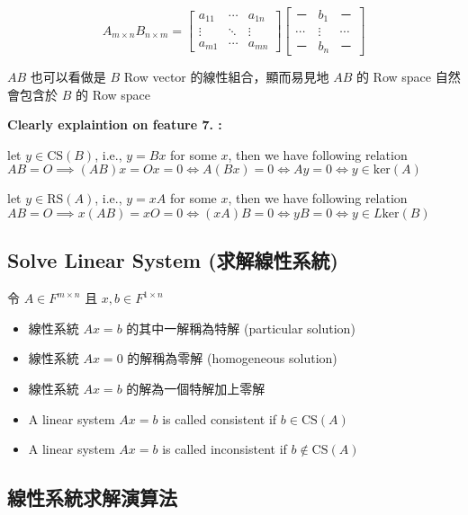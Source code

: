 \documentclass[
]{book}
\providecommand{\tightlist}{%
  \setlength{\itemsep}{0pt}\setlength{\parskip}{0pt}}
\begin{document}
\[
A_{m\times n}B_{n \times m} = \begin{bmatrix}
 a_{11} & \cdots & a_{1n}\\
 \vdots & \ddots & \vdots\\
 a_{m1} & \cdots & a_{mn}
\end{bmatrix}\begin{bmatrix}
 － & b_1 & －\\
 \cdots & \vdots & \cdots\\
 － & b_n &－
\end{bmatrix}
\]

\(AB\) 也可以看做是 \(B\) Row vector 的線性組合，顯而易見地 \(AB\) 的 Row space 自然會包含於 \(B\) 的 Row space

\textbf{Clearly explaintion on feature 7. :}

let \(y \in \mbox{CS}(B)\), i.e., \(y = Bx\) for some \(x\), then we have following relation \(AB = O \implies (AB)x = Ox = 0 \iff A(Bx) = 0 \iff Ay = 0 \iff y \in \mbox{ker}(A)\)

let \(y \in \mbox{RS}(A)\), i.e., \(y = xA\) for some \(x\), then we have following relation \(AB = O \implies x(AB) = xO = 0 \iff (xA)B = 0 \iff yB = 0 \iff y \in L\mbox{ker}(B)\)

\hypertarget{solve-linear-system-ux6c42ux89e3ux7ddaux6027ux7cfbux7d71}{%
\subsection{Solve Linear System (求解線性系統)}\label{solve-linear-system-ux6c42ux89e3ux7ddaux6027ux7cfbux7d71}}

令 \(A \in F^{m \times n}\) 且 \(x, b \in F^{1 \times n}\)

\begin{itemize}
\tightlist
\item
  線性系統 \(Ax = b\) 的其中一解稱為特解 (particular solution)
\item
  線性系統 \(Ax = 0\) 的解稱為零解 (homogeneous solution)
\item
  線性系統 \(Ax = b\) 的解為一個特解加上零解
\item
  A linear system \(Ax = b\) is called consistent if \(b \in \mbox{CS}(A)\)
\item
  A linear system \(Ax = b\) is called inconsistent if \(b \notin \mbox{CS}(A)\)
\end{itemize}

\hypertarget{ux7ddaux6027ux7cfbux7d71ux6c42ux89e3ux6f14ux7b97ux6cd5}{%
\subsection{線性系統求解演算法}\label{ux7ddaux6027ux7cfbux7d71ux6c42ux89e3ux6f14ux7b97ux6cd5}}
\end{document}
